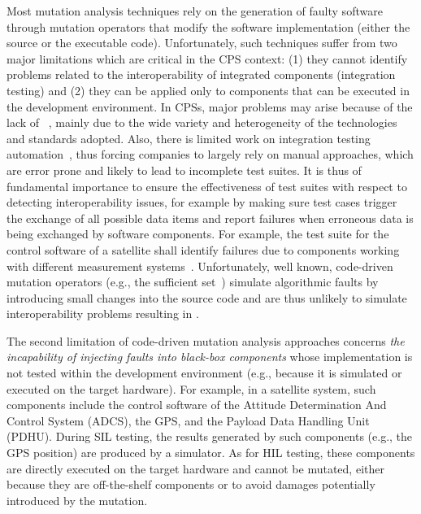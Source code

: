 Most mutation analysis techniques rely on the generation of faulty software through mutation operators that modify the software implementation (either the source or the executable code). 
Unfortunately, such techniques suffer from two major limitations which are critical in the CPS context: (1) they cannot identify problems related to the interoperability of integrated components (integration testing) and (2) they can be applied only to components that can be executed in the development environment.
In CPSs, major problems may arise because of the lack of  ~\cite{Givehchi:2017,Jirkovsk:2017}, mainly due to the wide variety and heterogeneity of the technologies and standards adopted.
Also, there is  limited work on integration testing automation~\cite{Abbaspour:2015}, thus forcing companies to largely rely on manual approaches, which are error prone and likely to lead to incomplete test suites. 
It is thus of fundamental importance to ensure the effectiveness of test suites with respect to detecting interoperability issues, for example by making sure test cases trigger the exchange of all possible data items and report failures when erroneous data is being exchanged by software components. For example, the test suite for the control software of a satellite shall identify failures due to components working with different measurement systems~\cite{MarsClimateOrbiter}.
Unfortunately, well known, code-driven mutation operators (e.g., the sufficient set~\cite{delamaro2014designing,delamaro2014experimental}) simulate algorithmic faults by introducing small changes into the source code and are thus unlikely to simulate interoperability problems resulting in . 


The second limitation of code-driven mutation analysis approaches concerns \emph{the incapability of injecting faults into black-box components} whose implementation is not tested within the development environment (e.g., because it is simulated or executed on the target hardware).
For example, in a satellite system, such components include the control software of the Attitude Determination And Control System (ADCS), the GPS, and the Payload Data Handling Unit (PDHU). During SIL testing, the results generated by such components (e.g., the GPS position) are produced by a simulator. As for HIL testing, these components are directly executed on the target hardware and cannot be mutated, either because they are off-the-shelf components 
or 
to avoid damages potentially introduced by the mutation.

